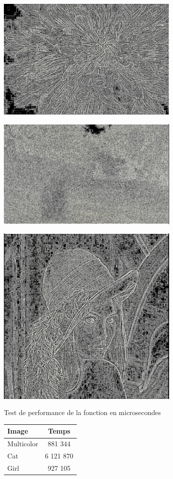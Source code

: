 \documentclass{article}
\begin{document}
\begin{center} 
    \includegraphics[width=9cm]{../Image_fonctions/Multicolor/Laplacien4.PNG}
\end{center}
\begin{center} 
    \includegraphics[width=9cm]{../Image_fonctions/Cat/Laplacien4.PNG}
\end{center}
\begin{center} 
    \includegraphics[width=9cm]{../Image_fonctions/Lenna/Laplacien4.PNG}
\end{center}

\begin{center}
\medbreak
Test de performance de la fonction en microsecondes
\bigbreak
   \begin{tabular}{ | l | c | }
     \hline
     Image & Temps \\
     \hline
     Multicolor & 881 344 \\
     \hline
     Cat & 6 121 870 \\
     \hline
     Girl & 927 105 \\
     \hline
   \end{tabular}
 \end{center}
\bigbreak
\end{document}
